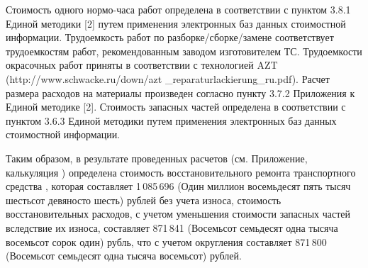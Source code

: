 \medskip
\renewcommand\baselinestretch{1.2}\small\normalsize
%
Стоимость одного нормо-часа работ определена в соответствии с пунктом 3.8.1 Единой методики [2] путем применения электронных баз данных стоимостной информации.
Трудоемкость работ по разборке/сборке/замене  соответствует трудоемкостям работ, рекомендованным заводом изготовителем ТС. Трудоемкости окрасочных работ приняты в соответствии с технологией  AZT (http://www.schwacke.ru/down/azt \_reparaturlackierung\_ru.pdf). Расчет размера расходов на материалы произведен  согласно пункту 3.7.2 Приложения к Единой методике [2]. 
Стоимость запасных частей определена в соответствии с пунктом 3.6.3 Единой методики путем применения электронных баз данных стоимостной информации.
%
\par Таким образом, в результате проведенных расчетов (см. Приложение, калькуляция \NomerDoc) определена стоимость восстановительного ремонта транспортного средства  , которая составляет 1\,085\,696 (Один миллион восемьдесят пять тысяч шестьсот девяносто шесть) рублей без учета износа,
стоимость восстановительных расходов, с учетом уменьшения стоимости запасных частей вследствие их износа,  составляет 871\,841 (Восемьсот семьдесят одна тысяча восемьсот сорок один) рубль, что с учетом округления составляет 871\,800 (Восемьсот семьдесят одна тысяча восемьсот) рублей.
\nopagebreak


%
